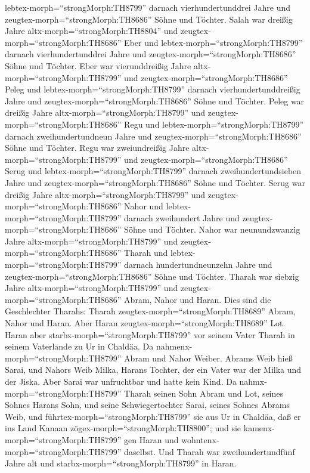 lebtex-morph=``strongMorph:TH8799'' darnach vierhundertunddrei Jahre und
zeugtex-morph=``strongMorph:TH8686'' Söhne und Töchter. 
Salah war dreißig Jahre altx-morph=``strongMorph:TH8804'' und
zeugtex-morph=``strongMorph:TH8686'' Eber  und
lebtex-morph=``strongMorph:TH8799'' darnach vierhundertunddrei Jahre und
zeugtex-morph=``strongMorph:TH8686'' Söhne und Töchter. 
Eber war vierunddreißig Jahre altx-morph=``strongMorph:TH8799'' und
zeugtex-morph=``strongMorph:TH8686'' Peleg  und
lebtex-morph=``strongMorph:TH8799'' darnach vierhundertunddreißig Jahre
und zeugtex-morph=``strongMorph:TH8686'' Söhne und Töchter.
 Peleg war dreißig Jahre altx-morph=``strongMorph:TH8799''
und zeugtex-morph=``strongMorph:TH8686'' Regu  und
lebtex-morph=``strongMorph:TH8799'' darnach zweihundertundneun Jahre und
zeugtex-morph=``strongMorph:TH8686'' Söhne und Töchter. 
Regu war zweiundreißig Jahre altx-morph=``strongMorph:TH8799'' und
zeugtex-morph=``strongMorph:TH8686'' Serug  und
lebtex-morph=``strongMorph:TH8799'' darnach zweihundertundsieben Jahre
und zeugtex-morph=``strongMorph:TH8686'' Söhne und Töchter.
 Serug war dreißig Jahre altx-morph=``strongMorph:TH8799''
und zeugtex-morph=``strongMorph:TH8686'' Nahor  und
lebtex-morph=``strongMorph:TH8799'' darnach zweihundert Jahre und
zeugtex-morph=``strongMorph:TH8686'' Söhne und Töchter. 
Nahor war neunundzwanzig Jahre altx-morph=``strongMorph:TH8799'' und
zeugtex-morph=``strongMorph:TH8686'' Tharah  und
lebtex-morph=``strongMorph:TH8799'' darnach hundertundneunzehn Jahre und
zeugtex-morph=``strongMorph:TH8686'' Söhne und Töchter. 
Tharah war siebzig Jahre altx-morph=``strongMorph:TH8799'' und
zeugtex-morph=``strongMorph:TH8686'' Abram, Nahor und Haran.
 Dies sind die Geschlechter Tharahs: Tharah
zeugtex-morph=``strongMorph:TH8689'' Abram, Nahor und Haran. Aber Haran
zeugtex-morph=``strongMorph:TH8689'' Lot.  Haran aber
starbx-morph=``strongMorph:TH8799'' vor seinem Vater Tharah in seinem
Vaterlande zu Ur in Chaldäa.  Da
nahmenx-morph=``strongMorph:TH8799'' Abram und Nahor Weiber. Abrams Weib
hieß Sarai, und Nahors Weib Milka, Harans Tochter, der ein Vater war der
Milka und der Jiska.  Aber Sarai war unfruchtbar und hatte
kein Kind.  Da nahmx-morph=``strongMorph:TH8799'' Tharah
seinen Sohn Abram und Lot, seines Sohnes Harans Sohn, und seine
Schwiegertochter Sarai, seines Sohnes Abrams Weib, und
führtex-morph=``strongMorph:TH8799'' sie aus Ur in Chaldäa, daß er ins
Land Kanaan zögex-morph=``strongMorph:TH8800''; und sie
kamenx-morph=``strongMorph:TH8799'' gen Haran und
wohntenx-morph=``strongMorph:TH8799'' daselbst.  Und Tharah
war zweihundertundfünf Jahre alt und starbx-morph=``strongMorph:TH8799''
in Haran.

